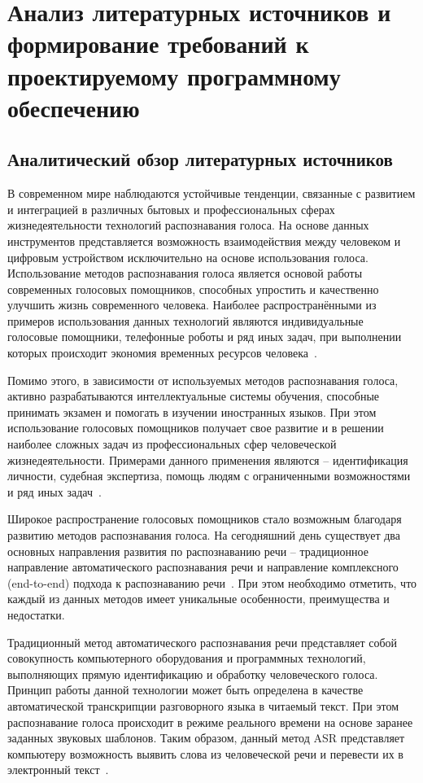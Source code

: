 \section{Анализ литературных источников и формирование требований к проектируемому программному обеспечению}

\subsection{Аналитический обзор литературных источников}

В современном мире наблюдаются устойчивые тенденции, связанные с развитием и интеграцией в различных бытовых и профессиональных сферах жизнедеятельности технологий распознавания голоса. На основе данных инструментов представляется возможность взаимодействия между человеком и цифровым устройством исключительно на основе использования голоса. Использование методов распознавания голоса является основой работы современных голосовых помощников, способных упростить и качественно улучшить жизнь современного человека. Наиболее распространёнными из примеров использования данных технологий являются индивидуальные голосовые помощники, телефонные роботы и ряд иных задач, при выполнении которых
происходит экономия временных ресурсов человека~\cite{Hein}.

Помимо этого, в зависимости от используемых методов распознавания голоса, активно разрабатываются интеллектуальные системы обучения, способные принимать экзамен и помогать в изучении иностранных языков. При этом использование голосовых помощников получает свое развитие и в решении наиболее сложных задач
из профессиональных сфер человеческой жизнедеятельности. Примерами данного применения являются – идентификация личности, судебная экспертиза, помощь людям с ограниченными возможностями и ряд иных задач~\cite{Muravyov}.

Широкое распространение голосовых помощников стало возможным благодаря развитию методов распознавания голоса. На сегодняшний день существует два основных направления развития по распознаванию речи – традиционное направление автоматического распознавания речи и направление комплексного (end-to-end)
подхода к распознаванию речи~\cite{Riqiang}. При этом необходимо отметить, что каждый из данных методов имеет уникальные особенности, преимущества и недостатки.

Традиционный метод автоматического распознавания речи представляет собой совокупность компьютерного оборудования и программных технологий, выполняющих прямую идентификацию и обработку человеческого голоса. Принцип работы данной технологии может быть определена в качестве автоматической транскрипции разговорного языка в читаемый текст. При этом распознавание голоса происходит в режиме реального времени на основе заранее заданных звуковых шаблонов. Таким образом, данный метод ASR представляет компьютеру возможность выявить слова из человеческой речи и перевести их в электронный текст~\cite{Khlopenkova}.

